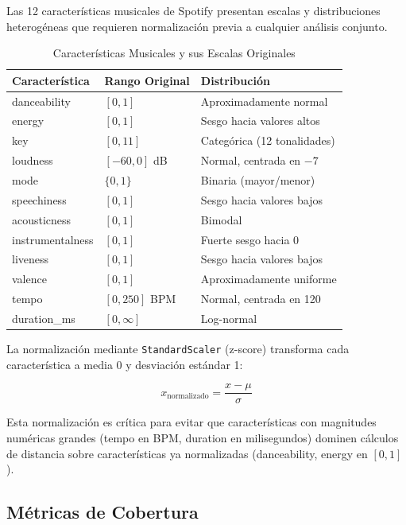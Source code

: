 Las 12 características musicales de Spotify presentan escalas y distribuciones heterogéneas que requieren normalización previa a cualquier análisis conjunto.

\begin{table}[htbp]
\centering
\caption{Características Musicales y sus Escalas Originales}
\label{tab:escalas-musicales}
\begin{tabular}{lll}
\toprule
\textbf{Característica} & \textbf{Rango Original} & \textbf{Distribución} \\
\midrule
danceability & $[0, 1]$ & Aproximadamente normal \\
energy & $[0, 1]$ & Sesgo hacia valores altos \\
key & $[0, 11]$ & Categórica (12 tonalidades) \\
loudness & $[-60, 0]$ dB & Normal, centrada en $-7$ \\
mode & $\{0, 1\}$ & Binaria (mayor/menor) \\
speechiness & $[0, 1]$ & Sesgo hacia valores bajos \\
acousticness & $[0, 1]$ & Bimodal \\
instrumentalness & $[0, 1]$ & Fuerte sesgo hacia 0 \\
liveness & $[0, 1]$ & Sesgo hacia valores bajos \\
valence & $[0, 1]$ & Aproximadamente uniforme \\
tempo & $[0, 250]$ BPM & Normal, centrada en 120 \\
duration\_ms & $[0, \infty]$ & Log-normal \\
\bottomrule
\end{tabular}
\end{table}

La normalización mediante \texttt{StandardScaler} (z-score) transforma cada característica a media 0 y desviación estándar 1:

\begin{equation}
\label{eq:zscore}
x_{\text{normalizado}} = \frac{x - \mu}{\sigma}
\end{equation}

Esta normalización es crítica para evitar que características con magnitudes numéricas grandes (tempo en BPM, duration en milisegundos) dominen cálculos de distancia sobre características ya normalizadas (danceability, energy en $[0,1]$).

\subsection{Métricas de Cobertura}
\label{subsec:metricas-cobertura}

